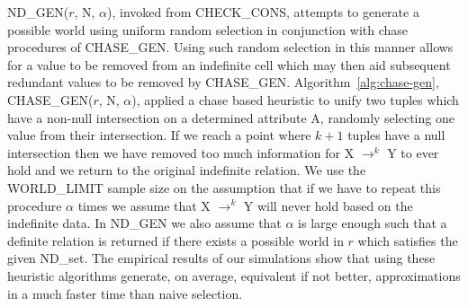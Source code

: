 ND\_GEN($r$, N, $\alpha$), invoked from
CHECK\_CONS, attempts to generate a possible world using uniform random
selection in conjunction with chase procedures of CHASE\_GEN. 
Using such random
selection in this manner allows for a value to be removed from an
indefinite cell which may then aid subsequent redundant values to be
removed by CHASE\_GEN.
Algorithm~\ref{alg:chase-gen}, CHASE\_GEN($r$, N, $\alpha$), applied a
chase based heuristic to unify two tuples which have a non-null
intersection on a determined attribute A, randomly selecting one value
from their intersection. If we reach a point where $k+1$ tuples have
a null intersection then we have removed too much information for X
$\to^k$ Y to ever hold and we return to the original indefinite
relation. We use the WORLD\_LIMIT sample size on the assumption that
if we have to repeat this procedure $\alpha$ times we assume that X
$\to^k$ Y will never hold based on the indefinite data. In ND\_GEN we
also assume that $\alpha$ is large enough such that a definite
relation is returned if there exists a possible world in $r$ which
satisfies the given ND\_set. The empirical results of our simulations
show that using these heuristic algorithms generate, on average, equivalent
if not better, approximations in a much faster time than naive selection.



